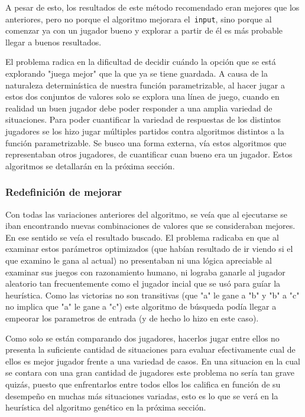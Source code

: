\documentclass[A4paper,oneside,fleqn,11pt]{article}
\theoremstyle{definition}
\begin{document}
A pesar de esto, los resultados de este método recomendado eran mejores que los anteriores, pero no porque el algoritmo mejorara el\texttt{ input}, sino porque al comenzar ya con un jugador bueno y explorar a partir de él es más probable llegar a buenos resultados. 

El problema radica en la dificultad de decidir cuándo la opción que se está explorando "juega mejor" que la que ya se tiene guardada. A causa de la naturaleza determinística de nuestra función parametrizable, al hacer jugar a estos dos conjuntos de valores solo se explora una línea de juego, cuando en realidad un buen jugador debe poder responder a una amplia variedad de situaciones. Para poder cuantificar la variedad de respuestas de los distintos jugadores se los hizo jugar múltiples partidos contra algoritmos distintos a la función parametrizable. Se busco una forma externa, vía estos algoritmos que representaban otros jugadores, de cuantificar cuan bueno era un jugador. Estos algoritmos se detallarán en la próxima sección.



\subsubsection {Redefinición de mejorar}


Con todas las variaciones anteriores del algoritmo, se veía que al ejecutarse se iban encontrando nuevas combinaciones de valores que se consideraban mejores. En ese sentido se veía el resultado buscado. El problema radicaba en que al examinar estos parámetros optimizados (que habían resultado de ir viendo si el que examino le gana al actual) no presentaban ni una lógica apreciable al examinar sus juegos con razonamiento humano, ni lograba ganarle al jugador aleatorio tan frecuentemente como el jugador incial que se usó para guíar la heurística.  Como las victorias no son transitivas (que "a" le gane a "b" y "b" a "c" no implica que "a" le gane a "c") este algoritmo de búsqueda podía llegar a empeorar los parametros de entrada (y de hecho lo hizo en este caso).

Como solo se están comparando dos jugadores, hacerlos jugar entre ellos no presenta la suficiente cantidad de situaciones para evaluar efectivamente cual de ellos es mejor jugador frente a una variedad de casos. En una situacion en la cual se contara con una gran cantidad de jugadores este problema no sería tan grave quizás, puesto que enfrentarlos entre todos ellos los califica en función de su desempeño en muchas más situaciones variadas, esto es lo que se verá en la heurística del algoritmo genético en la próxima sección.
\end{document}
